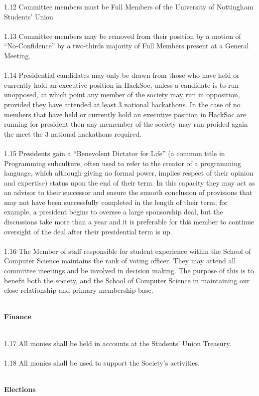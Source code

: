 \documentclass[a4paper,twoside,notitlepage,11pt]{article}
\newcommand{\consHead}[1]{\begin{Large}\textbf{#1}\end{Large}\ \\}
\begin{document}
1.12 Committee members must be Full Members of the University of Nottingham Students' Union\ \\
\ \\
1.13 Committee members may be removed from their position by a motion of ``No-Confidence'' by a two-thirds majority of Full Members present at a General Meeting.\ \\
\ \\
1.14 Presidential candidates may only be drawn from those who have held or currently hold an executive position in HackSoc, unless a candidate is to run unopposed, at which point any member of the society may run in opposition, provided they have attended at least 3 national hackathons. In the case of no members that have held or currently hold an executive position in HackSoc are running for president then any memember of the society may run proided again the meet the 3 national hackathons required.\ \\
\ \\
1.15 Presidents gain a ``Benevolent Dictator for Life'' (a common title in Programming subculture, often used to refer to the creator of a programming language, which although giving no formal power, implies respect of their opinion and expertise) status upon the end of their term. In this capacity they may act as an advisor to their successor and ensure the smooth conclusion of provisions that may not have been successfully completed in the length of their term; for example, a president begins to oversee a large sponsorship deal, but the discussions take more than a year and it is preferable for this member to continue oversight of the deal after their presidential term is up.\ \\
\ \\
1.16 The Member of staff responsible for student experience within the School of Computer Science maintains the rank of voting officer. They may attend all committee meetings and be involved in decision making. The purpose of this is to benefit both the society, and the School of Computer Science in maintaining our close relationship and primary membership base.\ \\
\ \\
\consHead{Finance}
1.17 All monies shall be held in accounts at the Students' Union Treasury.\ \\
\ \\
1.18 All monies shall be used to support the Society's activities.\ \\
\ \\
\consHead{Elections}
\end{document}
